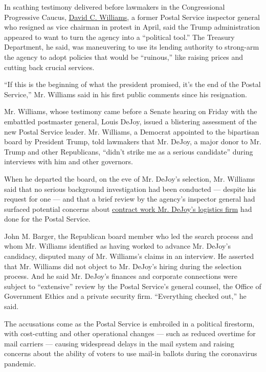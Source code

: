 In scathing testimony delivered before lawmakers in the Congressional
Progressive Caucus,
\href{https://www.nytimes3xbfgragh.onion/2020/08/20/us/politics/david-williams-postal-service.html?smid=tw-share}{David
C. Williams}, a former Postal Service inspector general who resigned as
vice chairman in protest in April, said the Trump administration
appeared to want to turn the agency into a ``political tool.'' The
Treasury Department, he said, was maneuvering to use its lending
authority to strong-arm the agency to adopt policies that would be
``ruinous,'' like raising prices and cutting back crucial services.

``If this is the beginning of what the president promised, it's the end
of the Postal Service,'' Mr. Williams said in his first public comments
since his resignation.

Mr. Williams, whose testimony came before a Senate hearing on Friday
with the embattled postmaster general, Louis DeJoy, issued a blistering
assessment of the new Postal Service leader. Mr. Williams, a Democrat
appointed to the bipartisan board by President Trump, told lawmakers
that Mr. DeJoy, a major donor to Mr. Trump and other Republicans,
``didn't strike me as a serious candidate'' during interviews with him
and other governors.

When he departed the board, on the eve of Mr. DeJoy's selection, Mr.
Williams said that no serious background investigation had been
conducted --- despite his request for one --- and that a brief review by
the agency's inspector general had surfaced potential concerns about
\href{https://www.nytimes3xbfgragh.onion/2020/08/17/us/politics/dejoy-postal-service-mail-in-voting.html}{contract
work Mr. DeJoy's logistics firm} had done for the Postal Service.

John M. Barger, the Republican board member who led the search process
and whom Mr. Williams identified as having worked to advance Mr. DeJoy's
candidacy, disputed many of Mr. Williams's claims in an interview. He
asserted that Mr. Williams did not object to Mr. DeJoy's hiring during
the selection process. And he said Mr. DeJoy's finances and corporate
connections were subject to ``extensive'' review by the Postal Service's
general counsel, the Office of Government Ethics and a private security
firm. ``Everything checked out,'' he said.

The accusations come as the Postal Service is embroiled in a political
firestorm, with cost-cutting and other operational changes --- such as
reduced overtime for mail carriers --- causing widespread delays in the
mail system and raising concerns about the ability of voters to use
mail-in ballots during the coronavirus pandemic.

